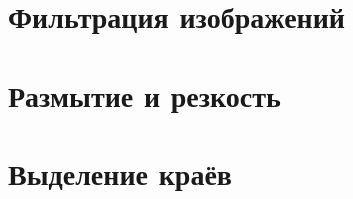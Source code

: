 \section{Фильтрация изображений}

\FloatBarrier

\section{Размытие и резкость}


\FloatBarrier

\section{Выделение краёв}

\FloatBarrier